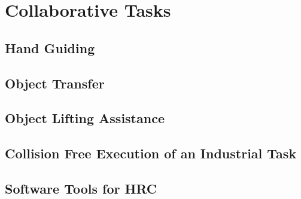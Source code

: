 \chapter{Collaborative Tasks}

\section{Hand Guiding}

\section{Object Transfer}

\section{Object Lifting Assistance}

\section{Collision Free Execution of an Industrial Task}

\section{Software Tools for HRC}
\label{sec:tools-hrc}